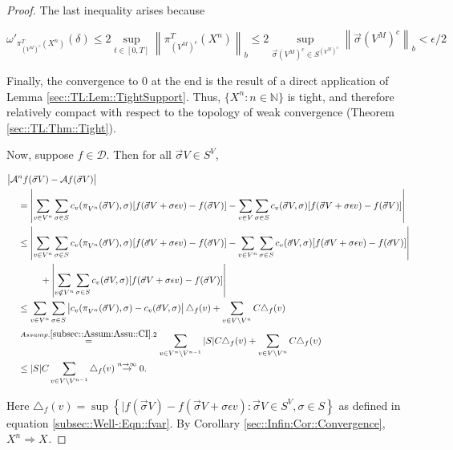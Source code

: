\documentclass[12pt]{article}
\newcommand{\mb}{\mathbb}
\newcommand{\mc}{\mathcal}
\newcommand{\ra}{\rightarrow}
\newcommand{\os}{\overset}
\newcommand{\ep}{\epsilon}
\newcommand{\ind}{\hspace{24pt}}
\renewcommand{\v}{v}							%
\renewcommand{\S}{S}							%
\newcommand{\s}{\sigma}							%
\newcommand{\sv}{\vec{\s}}						%
\renewcommand{\b}{b}							%
\newcommand{\ev}{\ep}							%
\newcommand{\T}{T}								%
\renewcommand{\t}{t}							%
\newcommand{\IG}{\mc{A}}						%
\newcommand{\pup}[1]{^{#1}}							%
\newcommand{\core}{\mc{D}}							%
\newcommand{\V}{V}									%
\newcommand{\numb}{n}								%
\newcommand{\XState}[1]{\S^{#1}}				%
\newcommand{\piV}[2]{\pi_{#1}^{#2}}					%
\newcommand{\rxvts}[2]{X_{#1}{#2}}					%
\newcommand{\rxvtsn}[3]{X_{#1}^{#3}{#2}}			%
\newcommand{\IGr}[1]{c_{#1}}						%
\newcommand{\const}[1]{C_{#1}}						%
\begin{document}
\begin{proof}
The last inequality arises because

\[\omega'_{\piV{\left(\V\pup{M}\right)^c}{\T}(\rxvtsn{}{}{\numb})}(\delta) \leq 2 \sup_{\t\in [0,\T]} \left\|\piV{\left(\V\pup{M}\right)^c}{\T}(\rxvtsn{}{}{\numb})\right\|_{\b{}} \leq 2 \sup_{\sv{}{\left(\V\pup{M}\right)^c} \in \S^{\left(\V\pup{M}\right)^c}} \left\|\sv{}{\left(\V\pup{M}\right)^c}\right\|_{\b{}} < \ep/2\]

Finally, the convergence to 0 at the end is the result of a direct application of Lemma \ref{sec::TL:Lem::TightSupport}. Thus, \(\{\rxvtsn{}{}{\numb}:\numb\in \mb{N}\}\) is tight, and therefore relatively compact with respect to the topology of weak convergence (Theorem \ref{sec::TL:Thm::Tight}).

Now, suppose \(f\in \core\). Then for all \(\sv{}{\V} \in \S^\V\),

\begin{align*}
\big|\IG&\pup{\numb}f(\sv{}{\V}) - \IG f(\sv{}{\V})\big|\\
&= \left|\sum_{\v \in \V\pup{\numb}} \sum_{\s \in \S} \IGr{\v}(\piV{\V\pup{\numb}}{}(\sv{}{\V}),\s)[f(\sv{}{\V}+\s\ev{\v}) - f(\sv{}{\V})] - \sum_{\v \in \V}\sum_{\s \in \S} \IGr{\v}(\sv{}{\V},\s)[f(\sv{}{\V}+\s\ev{\v}) - f(\sv{}{\V})]\right|\\
&\leq  \left|\sum_{\v \in \V\pup{\numb}} \sum_{\s \in \S} \IGr{\v}(\piV{\V\pup{\numb}}{}(\sv{}{\V}),\s)[f(\sv{}{\V}+\s\ev{\v}) - f(\sv{}{\V})] - \sum_{\v \in \V\pup{\numb}}\sum_{\s \in \S} \IGr{\v}(\sv{}{\V},\s)[f(\sv{}{\V}+\s\ev{\v}) - f(\sv{}{\V})]\right|\\
&\ind  +\left|\sum_{\v \notin \V\pup{\numb}} \sum_{\s\in \S} \IGr{\v}(\sv{}{\V},\s)[f(\sv{}{\V}+\s\ev{\v}) - f(\sv{}{\V})]\right|\\
&\leq \sum_{\v \in \V\pup{\numb}}\sum_{\s \in \S} \left|\IGr{\v}(\piV{\V\pup{\numb}}{}(\sv{}{\V}),\s) - \IGr{\v}(\sv{}{\V},\s)\right|\triangle_f(\v) + \sum_{\v \in \V\setminus \V\pup{\numb}} \const{}\triangle_f(\v)\\
&\os{Assump. \ref{subsec::Assum:Assu::CI}.2}{=} \sum_{\v \in \V\pup{\numb}\setminus\V\pup{\numb-1}} |\S|\const{} \triangle_f(\v) + \sum_{\v \in \V\setminus \V\pup{\numb}} \const{}\triangle_f(\v)\\
&\leq |\S|C\sum_{\v \in \V\setminus \V\pup{\numb-1}} \triangle_f(\v) \os{n\ra\infty}{\ra} 0.
\end{align*}

Here \(\triangle_f(\v) = \sup\left\{|f(\sv{}{\V}) - f(\sv{}{\V} + \s\ev{\v}): \sv{}{\V}\in \S^\V,\s \in \S\right\}\) as defined in equation \eqref{subsec::Well-:Eqn::fvar}. By Corollary \ref{sec::Infin:Cor::Convergence}, \(\rxvtsn{}{}{\numb}\Rightarrow \rxvts{}{}\).
\end{proof}
\end{document}
